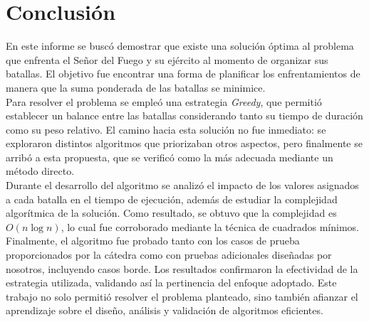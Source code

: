\section{Conclusión}
En este informe se buscó demostrar que existe una solución óptima al problema que enfrenta el Señor del Fuego y su ejército al momento de organizar sus batallas. El objetivo fue encontrar una forma de planificar los enfrentamientos de manera que la suma ponderada de las batallas se minimice. \\

Para resolver el problema se empleó una estrategia \textit{Greedy}, que permitió establecer un balance entre las batallas considerando tanto su tiempo de duración como su peso relativo. El camino hacia esta solución no fue inmediato: se exploraron distintos algoritmos que priorizaban otros aspectos, pero finalmente se arribó a esta propuesta, que se verificó como la más adecuada mediante un método directo. \\

Durante el desarrollo del algoritmo se analizó el impacto de los valores asignados a cada batalla en el tiempo de ejecución, además de estudiar la complejidad algorítmica de la solución. Como resultado, se obtuvo que la complejidad es $O(n \log n)$, lo cual fue corroborado mediante la técnica de cuadrados mínimos. \\

Finalmente, el algoritmo fue probado tanto con los casos de prueba proporcionados por la cátedra como con pruebas adicionales diseñadas por nosotros, incluyendo casos borde. Los resultados confirmaron la efectividad de la estrategia utilizada, validando así la pertinencia del enfoque adoptado. Este trabajo no solo permitió resolver el problema planteado, sino también afianzar el aprendizaje sobre el diseño, análisis y validación de algoritmos eficientes.
